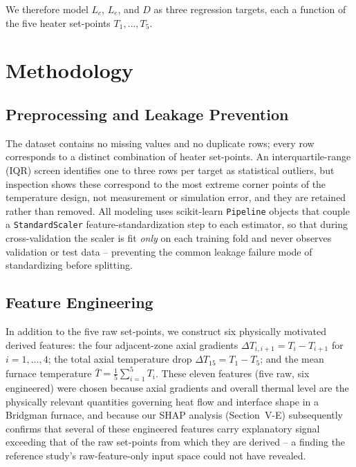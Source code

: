 \documentclass[conference]{IEEEtran}
\begin{document}
We therefore model $L_c$, $L_e$, and $D$ as three regression targets, each a function of the five heater set-points $T_1,\ldots,T_5$.

\section{Methodology}
\subsection{Preprocessing and Leakage Prevention}
The dataset contains no missing values and no duplicate rows; every row corresponds to a distinct combination of heater set-points. An interquartile-range (IQR) screen identifies one to three rows per target as statistical outliers, but inspection shows these correspond to the most extreme corner points of the temperature design, not measurement or simulation error, and they are retained rather than removed. All modeling uses scikit-learn \cite{pedregosa2011} \texttt{Pipeline} objects that couple a \texttt{StandardScaler} feature-standardization step to each estimator, so that during cross-validation the scaler is fit \emph{only} on each training fold and never observes validation or test data -- preventing the common leakage failure mode of standardizing before splitting.

\subsection{Feature Engineering}
In addition to the five raw set-points, we construct six physically motivated derived features: the four adjacent-zone axial gradients $\Delta T_{i,i+1}=T_i-T_{i+1}$ for $i=1,\ldots,4$; the total axial temperature drop $\Delta T_{15}=T_1-T_5$; and the mean furnace temperature $\bar{T}=\tfrac{1}{5}\sum_{i=1}^{5}T_i$. These eleven features (five raw, six engineered) were chosen because axial gradients and overall thermal level are the physically relevant quantities governing heat flow and interface shape in a Bridgman furnace, and because our SHAP analysis (Section~V-E) subsequently confirms that several of these engineered features carry explanatory signal exceeding that of the raw set-points from which they are derived -- a finding the reference study's raw-feature-only input space could not have revealed.
\end{document}
